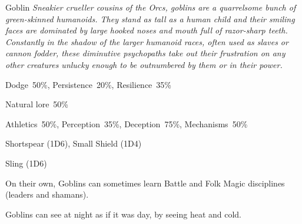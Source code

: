 \begin{monsterbox}{Goblin}
	\textit{Sneakier crueller cousins of the Orcs, goblins are a quarrelsome bunch of green-skinned humanoids. They stand as tall as a human child and their smiling faces are dominated by large hooked noses and mouth full of razor-sharp teeth. Constantly in the shadow of the larger humanoid races, often used as slaves or cannon fodder, these diminutive psychopaths take out their frustration on any other creatures unlucky enough to be outnumbered by them or in their power.}\\
	\rpghline
	\basics[%
        hitpoints  = 9, %
	majorwound = 5,
	damagemodifier = 0,
	powerpoints = 10,
	movementrate = 15m,
	armor = Leather (2AP),
	plunderrating = 1
	]
	\rpghline%
	\stats[ %
		STR = 2D6+3 (10),
		CON = 2D6+3 (10),
		DEX = 5D6   (17),
		SIZ = 2D6   (7),
		INT = 3D6   (11),
		POW = 2D6+3 (10),
		CHA = 2D6   (7)
	]
	\rpghline%
	\begin{rpg-monsteraction}[Resistances]
		Dodge~50\%, Persistence~20\%, Resilience~35\%
	\end{rpg-monsteraction}
	\begin{rpg-monsteraction}[Knowledge]
    		Natural lore~50\%
	\end{rpg-monsteraction}
	\begin{rpg-monsteraction}[Practical]
		Athletics~50\%, Perception~35\%, Deception~75\%, Mechanisms~50\%
	\end{rpg-monsteraction}
	\begin{rpg-monsteraction}
		Shortspear (1D6), Small Shield (1D4)
	\end{rpg-monsteraction}
	\begin{rpg-monsteraction}
		Sling (1D6)
	\end{rpg-monsteraction}
	\begin{rpg-monsteraction}[Supernatural]
		On their own, Goblins can sometimes learn Battle and Folk Magic disciplines (leaders and shamans).
	\end{rpg-monsteraction}
	\begin{rpg-monsteraction}[Thermoception]
		Goblins can see at night as if it was day, by seeing heat and cold.
	\end{rpg-monsteraction}

\end{monsterbox}

